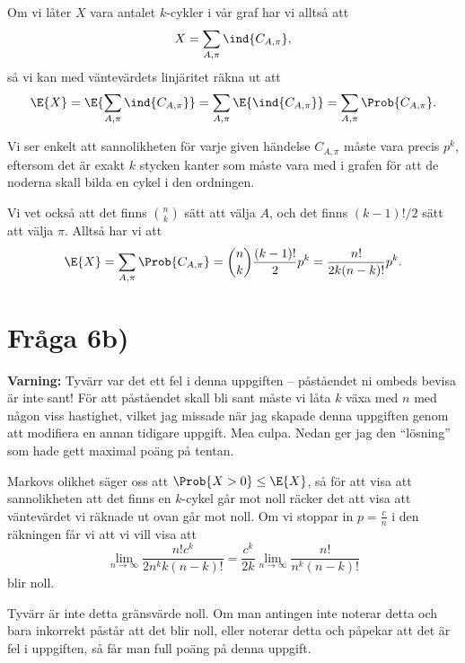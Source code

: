 \documentclass[nobib]{tufte-handout}
\begin{document}
Om vi låter $X$ vara antalet $k$-cykler i vår graf har vi alltså att
$$X = \sum_{A, \pi} \ind{C_{A,\pi}},$$
så vi kan med väntevärdets linjäritet räkna ut att
$$\E{X} = \E{\sum_{A, \pi} \ind{C_{A,\pi}}} = \sum_{A, \pi} \E{\ind{C_{A,\pi}}} = \sum_{A, \pi} \Prob{C_{A,\pi}}.$$

Vi ser enkelt att sannolikheten för varje given händelse $C_{A,\pi}$ måste vara precis $p^k$, eftersom det är exakt $k$ stycken kanter som måste vara med i grafen för att de noderna skall bilda en cykel i den ordningen.

Vi vet också att det finns $n \choose k$ sätt att välja $A$, och det finns $(k-1)!/2$ sätt att välja $\pi$. Alltså har vi att
$$\E{X} = \sum_{A, \pi} \Prob{C_{A,\pi}} = {n \choose k}\frac{(k-1)!}{2}p^k = \frac{n!}{2 k (n-k)!} p^k.$$

\section{Fråga 6b)}

{\large \textbf{Varning:}} Tyvärr var det ett fel i denna uppgiften -- påståendet ni ombeds bevisa är inte sant! För att påståendet skall bli sant måste vi låta $k$ växa med $n$ med någon viss hastighet, vilket jag missade när jag skapade denna uppgiften genom att modifiera en annan tidigare uppgift. Mea culpa. Nedan ger jag den ``lösning'' som hade gett maximal poäng på tentan.

Markovs olikhet säger oss att $\Prob{X > 0} \leq \E{X}$, så för att visa att sannolikheten att det finns en $k$-cykel går mot noll räcker det att visa att väntevärdet vi räknade ut ovan går mot noll. Om vi stoppar in $p = \frac{c}{n}$ i den räkningen får vi att vi vill visa att
$$\lim_{n \to \infty} \frac{n! c^k}{2 n^k k (n-k)!} = \frac{c^k}{2k}\lim_{n \to \infty} \frac{n!}{n^k (n-k)!}$$
blir noll.

Tyvärr är inte detta gränsvärde noll. Om man antingen inte noterar detta och bara inkorrekt påstår att det blir noll, eller noterar detta och påpekar att det är fel i uppgiften, så får man full poäng på denna uppgift.
\end{document}
